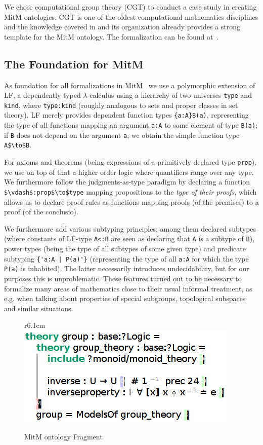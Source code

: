We chose computational group theory (CGT) to conduct a case study in creating
MitM ontologies. CGT is one of the oldest computational mathematics disciplines
and the knowledge covered in \GAP and its organization already provides a strong
template for the MitM ontology. The formalization can be found
at~\cite{mitm:groups:on}.

\subsection{The Foundation for MitM}
As foundation for all formalizations in MitM~\cite{mitm:foundation:on} we use a
polymorphic extension of LF, a dependently typed $\lambda$-calculus using a
hierarchy of two universes \lstinline|type| and \lstinline|kind|, where
\lstinline|type:kind| (roughly analogous to sets and proper classes in set
theory). LF merely provides dependent function types \lstinline|{a:A}B(a)|,
representing the type of all functions mapping an argument \lstinline|a:A| to
some element of type \lstinline|B(a)|; if \lstinline|B| does not depend on the
argument \lstinline|a|, we obtain the simple function type
\lstinline[mathescape]|A$\to$B|.

For axioms and theorems (being expressions of a primitively declared type
\lstinline|prop|), we use on top of that a higher order logic where quantifiers
range over any type. We furthermore follow the judgments-as-type paradigm by
declaring a function \lstinline[mathescape]|$\vdash$:prop$\to$type| mapping
propositions to the \emph{type of their proofs}, which allows us to declare
proof rules as functions mapping proofs (of the premises) to a proof (of the
conclusio).

We furthermore add various subtyping principles; among them declared subtypes
(where constants of LF-type \lstinline|A<:B| are seen as declaring that
\lstinline|A| is a subtype of \lstinline|B|), power types (being the type of all
subtypes of some given type) and predicate subtyping \lstinline?{'a:A | P(a)'}?
(representing the type of all \lstinline|a:A| for which the type
\lstinline|P(a)| is inhabited). The latter necessarily introduces
undecidability, but for our purposes this is unproblematic. These features
turned out to be necessary to formalize many areas of mathematics close to their
usual informal treatment, as e.g. when talking about properties of special
subgroups, topological subspaces and similar situations.

\begin{figure}r{6.1cm}\vspace*{-2.5em}
  \includegraphics[width=.5\textwidth]{mitm1}\vspace*{-1em}
  \caption{MitM ontology Fragment}\label{fig:mitm1}\vspace*{-1em}
\end{figure}

